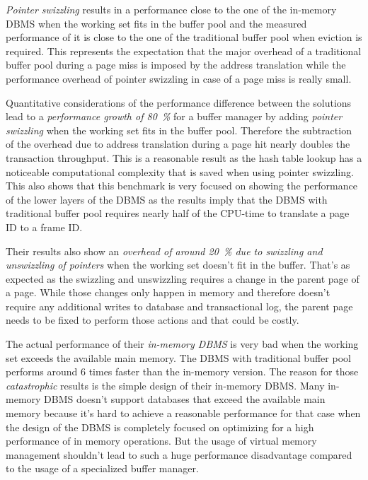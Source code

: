 	\emph{Pointer swizzling} results in a performance close to the one of the in-memory DBMS when the working set fits in the buffer pool and the measured performance of it is close to the one of the traditional buffer pool when eviction is required. This represents the expectation that the major overhead of a traditional buffer pool during a page miss is imposed by the address translation while the performance overhead of pointer swizzling in case of a page miss is really small.
	
	Quantitative considerations of the performance difference between the solutions lead to a \emph{performance growth of \SI{80}{\percent}} for a buffer manager by adding \emph{pointer swizzling} when the working set fits in the buffer pool. Therefore the subtraction of the overhead due to address translation during a page hit nearly doubles the transaction throughput. This is a reasonable result as the hash table lookup has a noticeable computational complexity that is saved when using pointer swizzling. This also shows that this benchmark is very focused on showing the performance of the lower layers of the DBMS as the results imply that the DBMS with traditional buffer pool requires nearly half of the CPU-time to translate a page ID to a frame ID.
	
	Their results also show an \emph{overhead of around \SI{20}{\percent} due to swizzling and unswizzling of pointers} when the working set doesn't fit in the buffer. That's as expected as the swizzling and unswizzling requires a change in the parent page of a page. While those changes only happen in memory and therefore doesn't require any additional writes to database and transactional log, the parent page needs to be fixed to perform those actions and that could be costly.
	
	The actual performance of their \emph{in-memory DBMS} is very bad when the working set exceeds the available main memory. The DBMS with traditional buffer pool performs around 6 times faster than the in-memory version. The reason for those \emph{catastrophic} results is the simple design of their in-memory DBMS. Many in-memory DBMS doesn't support databases that exceed the available main memory because it's hard to achieve a reasonable performance for that case when the design of the DBMS is completely focused on optimizing for a high performance of in memory operations. But the usage of virtual memory management shouldn't lead to such a huge performance disadvantage compared to the usage of a specialized buffer manager.
	
